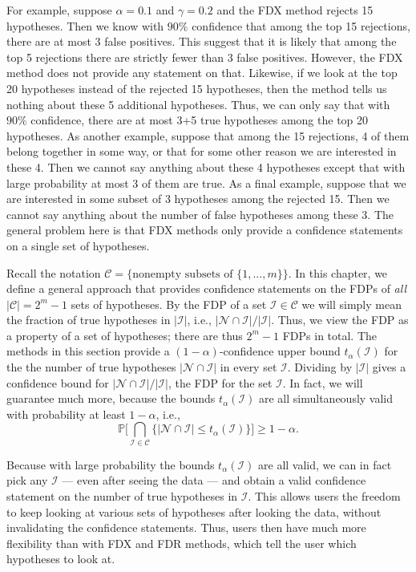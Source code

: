 \documentclass[11pt]{article}
\theoremstyle{plain}
\theoremstyle{definition}
\newcommand{\N}{\mathcal{N}}
\newcommand{\I}{\mathcal{I}}
\newcommand{\C}{\mathcal{C}}
\newcommand{\pr}{\mathbb{P}}
\newcommand{\subs}{\mathcal{C}}
\begin{document}
For example, suppose $\alpha=0.1$ and $\gamma=0.2$ and the FDX method rejects 15 hypotheses. Then we know with $90\%$ confidence that among the top 15 rejections, there are at most 3 false positives. This suggest that it is likely that among the top 5 rejections there are strictly fewer than 3 false positives. However, the FDX method does not provide any statement on that. Likewise, if we look at the top 20 hypotheses instead of the rejected 15 hypotheses, then the method tells us nothing about these 5 additional hypotheses. Thus, we can only say that with $90\%$ confidence, there are at most 3+5 true hypotheses among the top 20 hypotheses.
As another example, suppose that among the 15 rejections, 4 of them belong together in some way, or that for some other reason we are interested in these 4. Then we cannot say anything about these 4 hypotheses except that with large probability at most 3 of them are true. As a final example, suppose that we are interested in some subset of 3 hypotheses among the rejected 15. Then we cannot say anything about the number of false hypotheses among these 3. The general problem here is that FDX methods only provide a confidence statements on a single set of hypotheses.

Recall the notation $\C=\{\text{nonempty subsets of }\{1,...,m\}\}$.
In this chapter, we define a general approach that provides confidence statements on the FDPs of \emph{all} $|\C|=2^m-1$ sets of hypotheses. By the FDP of a set $\I\in \C$ we will simply mean the fraction of true hypotheses in $|\I|$, i.e., $|\N\cap\I|/|\I|$. Thus, we view the FDP as a property of a set of hypotheses; there are thus $2^m-1$ FDPs in total.
 The methods in this section  provide a $(1-\alpha)$-confidence upper bound $t_{\alpha}(\I)$ for the the number of true hypotheses $|\N\cap\I|$ in every set $\I$. Dividing by $|\I|$ gives a confidence bound for  $|\N\cap\I|/|\I|$, the FDP  for the set $\I$. %
In fact, we will guarantee  much more, because the bounds $t_{\alpha}(\I)$ are all simultaneously valid with probability at least $1-\alpha$, i.e., 
\begin{equation} \label{GSresult}
   \mathbb{P} \Bigg[\bigcap_{\I\in\subs}\Big\{     |\N\cap \I| \leq t_{\alpha}(\I)   \Big\} \Bigg]\geq 1-\alpha.
   \end{equation}

   Because with large probability the bounds $t_{\alpha}(\I)$ are all valid, we can in fact pick any $\I$ --- even after seeing the data --- and obtain a valid confidence statement on the number of true hypotheses in $\I$. This allows users the freedom to keep looking at various sets of hypotheses after looking the data, without invalidating the confidence statements. Thus, users then have much more flexibility than with FDX and FDR methods, which tell the user which hypotheses to look at.
   
\end{document}
